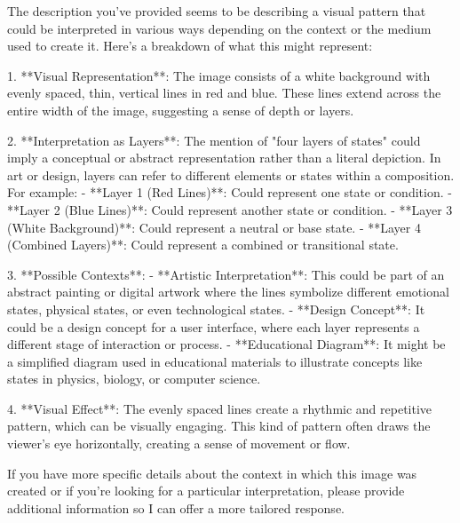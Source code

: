 The description you've provided seems to be describing a visual pattern that could be interpreted in various ways depending on the context or the medium used to create it. Here's a breakdown of what this might represent:

1. **Visual Representation**: The image consists of a white background with evenly spaced, thin, vertical lines in red and blue. These lines extend across the entire width of the image, suggesting a sense of depth or layers.

2. **Interpretation as Layers**: The mention of "four layers of states" could imply a conceptual or abstract representation rather than a literal depiction. In art or design, layers can refer to different elements or states within a composition. For example:
   - **Layer 1 (Red Lines)**: Could represent one state or condition.
   - **Layer 2 (Blue Lines)**: Could represent another state or condition.
   - **Layer 3 (White Background)**: Could represent a neutral or base state.
   - **Layer 4 (Combined Layers)**: Could represent a combined or transitional state.

3. **Possible Contexts**:
   - **Artistic Interpretation**: This could be part of an abstract painting or digital artwork where the lines symbolize different emotional states, physical states, or even technological states.
   - **Design Concept**: It could be a design concept for a user interface, where each layer represents a different stage of interaction or process.
   - **Educational Diagram**: It might be a simplified diagram used in educational materials to illustrate concepts like states in physics, biology, or computer science.

4. **Visual Effect**: The evenly spaced lines create a rhythmic and repetitive pattern, which can be visually engaging. This kind of pattern often draws the viewer's eye horizontally, creating a sense of movement or flow.

If you have more specific details about the context in which this image was created or if you're looking for a particular interpretation, please provide additional information so I can offer a more tailored response.